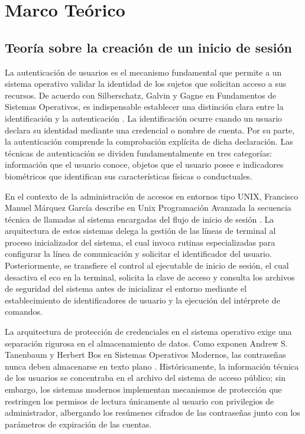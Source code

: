 \section{Marco Teórico}

\subsection{Teoría sobre la creación de un inicio de sesión}

La autenticación de usuarios es el mecanismo fundamental que permite a un sistema operativo validar la identidad de los sujetos que solicitan acceso a sus recursos.
De acuerdo con Silberschatz, Galvin y Gagne en Fundamentos de Sistemas Operativos, es indispensable establecer una distinción clara entre la identificación y la autenticación \cite{silberschatz2006}.
La identificación ocurre cuando un usuario declara su identidad mediante una credencial o nombre de cuenta.
Por su parte, la autenticación comprende la comprobación explícita de dicha declaración.
Las técnicas de autenticación se dividen fundamentalmente en tres categorías: información que el usuario conoce, objetos que el usuario posee e indicadores biométricos que identifican sus características físicas o conductuales.

En el contexto de la administración de accesos en entornos tipo UNIX, Francisco Manuel Márquez García describe en Unix Programación Avanzada la secuencia técnica de llamadas al sistema encargadas del flujo de inicio de sesión \cite{marquez2004}.
La arquitectura de estos sistemas delega la gestión de las líneas de terminal al proceso inicializador del sistema, el cual invoca rutinas especializadas para configurar la línea de comunicación y solicitar el identificador del usuario.
Posteriormente, se transfiere el control al ejecutable de inicio de sesión, el cual desactiva el eco en la terminal, solicita la clave de acceso y consulta los archivos de seguridad del sistema antes de inicializar el entorno mediante el establecimiento de identificadores de usuario y la ejecución del intérprete de comandos.

La arquitectura de protección de credenciales en el sistema operativo exige una separación rigurosa en el almacenamiento de datos.
Como exponen Andrew S. Tanenbaum y Herbert Bos en Sistemas Operativos Modernos, las contraseñas nunca deben almacenarse en texto plano \cite{tanenbaum2024}.
Históricamente, la información técnica de los usuarios se concentraba en el archivo del sistema de acceso público; sin embargo, los sistemas modernos implementan mecanismos de protección que restringen los permisos de lectura únicamente al usuario con privilegios de administrador, albergando los resúmenes cifrados de las contraseñas junto con los parámetros de expiración de las cuentas.

